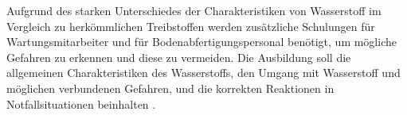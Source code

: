 %
Aufgrund des starken Unterschiedes der Charakteristiken von Wasserstoff 
im Vergleich zu herkömmlichen Treibstoffen werden zusätzliche Schulungen für 
Wartungsmitarbeiter und für Bodenabfertigungspersonal benötigt, 
um mögliche Gefahren zu erkennen und diese zu vermeiden. 
Die Ausbildung soll die allgemeinen Charakteristiken des Wasserstoffs, 
den Umgang mit Wasserstoff und möglichen verbundenen Gefahren, 
und die korrekten Reaktionen in Notfallsituationen beinhalten \cite{rietdijk2024architecture}.
%
%
%
%
%
%
